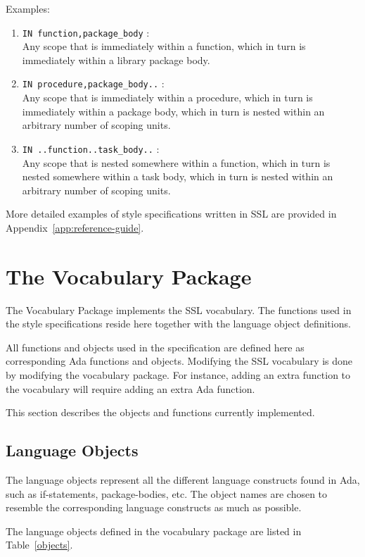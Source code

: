 Examples:

\begin{enumerate}
\item
{\tt IN function,package\_body} :\\
Any scope that is immediately within a function, which in turn is
immediately within a library package body.
\item
{\tt IN procedure,package\_body..} :\\
Any scope that is immediately within a procedure, which in turn is
immediately within a package body, which in turn is nested within an
arbitrary number of scoping units.
\item
{\tt IN ..function..task\_body..} :\\
Any scope that is nested somewhere within a function, which in turn
is nested somewhere within a task body, which in turn is nested within
an arbitrary number of scoping units.
\end{enumerate}

More detailed examples of style specifications written in SSL
are provided in Appendix~\ref{app:reference-guide}.

\section{The Vocabulary Package}

The Vocabulary Package implements the SSL vocabulary. The
functions used in the style specifications reside here together with
the language object definitions.

All functions and objects used in the specification are defined
here as corresponding Ada functions and objects. Modifying the SSL
vocabulary is done 
by modifying the vocabulary package. For instance, adding an extra
function to the vocabulary will require adding an extra Ada function.

This section describes the objects and functions currently implemented.

\subsection{Language Objects}

The language objects represent all the different language
constructs found in Ada, such as if-statements, package-bodies, etc.
The object names are chosen to resemble the corresponding language
constructs as much as possible.

The language objects defined in the vocabulary package are listed in
Table~\ref{objects}.

